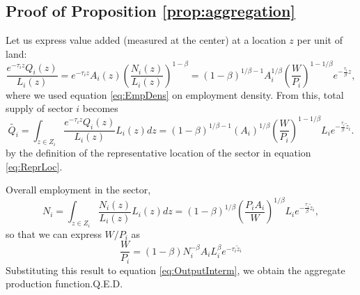 \documentclass[12pt]{article}
\begin{document}
\subsection{Proof of Proposition \ref{prop:aggregation}}
Let us express value added (measured at the center) at a location $z$ per unit of land:
\[
\frac{e^{-\tau_i z} Q_i(z)}{L_i(z)} = e^{-\tau_i z} A_i(z)\left(\frac{N_i(z)}{L_i(z)}\right)^{1-\beta} = (1-\beta)^{1/\beta-1}
A_i^{1/\beta}\left(\frac{W}{P_i}\right)^{1-1/\beta}
 e^{-\frac{\tau_i}{\beta} z},
\]
where we used equation \ref{eq:EmpDens} on employment density. From this, total supply of sector $i$ becomes
\begin{equation}
\label{eq:OutputInterm}
\tilde{Q_i} = \int_{z\in Z_i}\frac{e^{-\tau_i z} Q_i(z)}{L_i(z)}L_i(z)dz=(1-\beta)^{1/\beta-1}
(A_i)^{1/\beta}\left(\frac{W}{P_i}\right)^{1-1/\beta} L_i e^{-\frac{\tau_i}{\beta} \tilde z_i}.
\end{equation}
by the definition of the representative location of the sector in equation \ref{eq:ReprLoc}.

Overall employment in the sector,
\[
N_i = \int_{z\in Z_i}\frac{N_i(z)}{L_i(z)}L_i(z)dz= (1-\beta)^{1/\beta}
\left(\frac{P_iA_i}{W}\right)^{1/\beta} L_i e^{-\frac{\tau_i}{\beta} \tilde z_i},
\]
so that we can express $W/P_i$ as
\[
\frac{W}{P_i} = (1-\beta)
N_i^{-\beta}A_i L_i^{\beta}
 e^{-\tau_i\tilde z_i}
\]
Substituting this result to equation \eqref{eq:OutputInterm}, we obtain the aggregate production function.\hfill Q.E.D.


\end{document}
